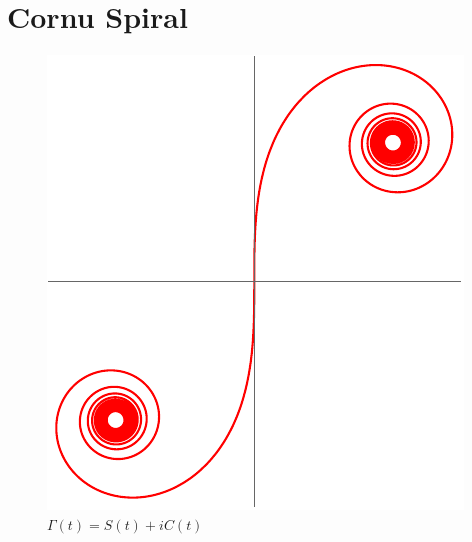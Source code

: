 \newpage
\section{Cornu Spiral}

\begin{figure}[ht]
    \centering
    \includegraphics[scale=0.5]{assets/cornu}   %
    \caption{$\Gamma(t)=S(t)+iC(t)$}
\end{figure}